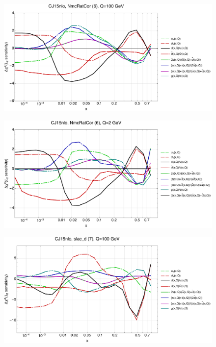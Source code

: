\documentclass[10pt,aps,prd,floatfix,titlepage]{revtex4}
\begin{document}
\clearpage
\begin{figure}
\includegraphics[width=\textwidth,height=0.44\textheight,keepaspectratio]{2/6_CJ15nlo_q100_Sf_2.pdf}
\caption{}
\end{figure}
\begin{figure}
\includegraphics[width=\textwidth,height=0.44\textheight,keepaspectratio]{2/6_CJ15nlo_q2_Sf_2.pdf}
\caption{}
\end{figure}
\clearpage
\begin{figure}
\includegraphics[width=\textwidth,height=0.44\textheight,keepaspectratio]{2/7_CJ15nlo_q100_Sf_2.pdf}
\caption{}
\end{figure}
\end{document}
